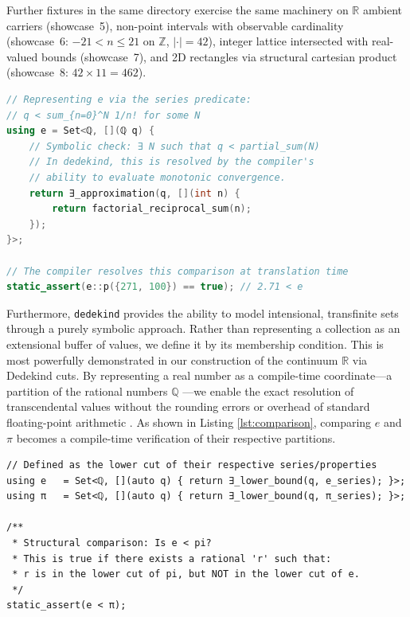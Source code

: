 \documentclass[11pt, a4paper]{report}
\begin{document}
Further fixtures in the same directory exercise the same machinery on
$\mathbb{R}$ ambient carriers (showcase~5), non-point intervals with
observable cardinality (showcase~6: $-21 < n \leq 21$ on $\mathbb{Z}$,
$|\cdot|=42$), integer lattice intersected with real-valued bounds
(showcase~7), and 2D rectangles via structural cartesian product
(showcase~8: $42 \times 11 = 462$).

\begin{lstlisting}[language=C++, caption={Illustration of the symbolic construction of $e$ as an intensional set (the lower cut $L \subset \mathbb{Q}$).}, label={lst:euler}]
// Representing e via the series predicate: 
// q < sum_{n=0}^N 1/n! for some N
using e = Set<ℚ, [](ℚ q) {
    // Symbolic check: ∃ N such that q < partial_sum(N)
    // In dedekind, this is resolved by the compiler's 
    // ability to evaluate monotonic convergence.
    return ∃_approximation(q, [](int n) { 
        return factorial_reciprocal_sum(n); 
    });
}>;

// The compiler resolves this comparison at translation time
static_assert(e::p({271, 100}) == true); // 2.71 < e
\end{lstlisting}


Furthermore, \texttt{dedekind} provides the ability to model intensional, transfinite sets through a purely symbolic approach. Rather than representing a collection as an extensional buffer of values, we define it by its membership condition. This is most powerfully demonstrated in our construction of the continuum $\mathbb{R}$ via Dedekind cuts. By representing a real number as a compile-time coordinate—a partition of the rational numbers $\mathbb{Q}$ —we enable the exact resolution of transcendental values without the rounding errors or overhead of standard floating-point arithmetic \cite{ieee754_2019}. As shown in Listing \ref{lst:comparison}, comparing $e$ and $\pi$ becomes a compile-time verification of their respective partitions.

\begin{lstlisting}[caption={Illustration of the comparison of the transcendental constants $e$ and $\pi$ via their Dedekind partitions.}, label={lst:comparison}]
// Defined as the lower cut of their respective series/properties
using e   = Set<ℚ, [](auto q) { return ∃_lower_bound(q, e_series); }>;
using π   = Set<ℚ, [](auto q) { return ∃_lower_bound(q, π_series); }>;

/** 
 * Structural comparison: Is e < pi? 
 * This is true if there exists a rational 'r' such that:
 * r is in the lower cut of pi, but NOT in the lower cut of e.
 */
static_assert(e < π); 
\end{lstlisting}
\end{document}
